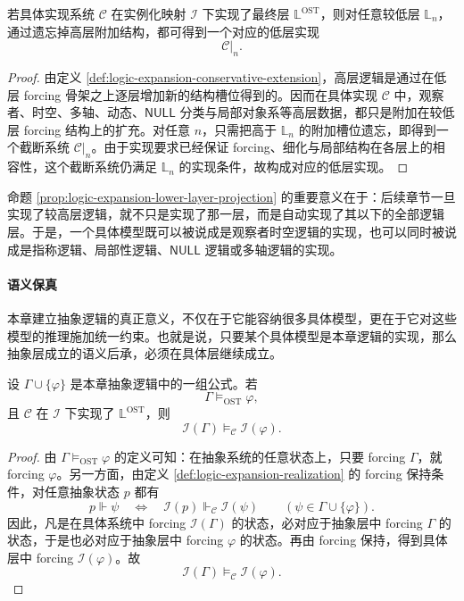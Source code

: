 \begin{proposition}[下层投影]\label{prop:logic-expansion-lower-layer-projection}
若具体实现系统 \(\mathcal C\) 在实例化映射 \(\mathcal I\) 下实现了最终层 \(\mathbb L^{\mathrm{OST}}\)，则对任意较低层 \(\mathbb L_n\)，通过遗忘掉高层附加结构，都可得到一个对应的低层实现
\[
\mathcal C|_n.
\]
\end{proposition}

\begin{proof}
由定义 \ref{def:logic-expansion-conservative-extension}，高层逻辑是通过在低层 forcing 骨架之上逐层增加新的结构槽位得到的。因而在具体实现 \(\mathcal C\) 中，观察者、时空、多轴、动态、\(\mathsf{NULL}\) 分类与局部对象系等高层数据，都只是附加在较低层 forcing 结构上的扩充。对任意 \(n\)，只需把高于 \(\mathbb L_n\) 的附加槽位遗忘，即得到一个截断系统 \(\mathcal C|_n\)。由于实现要求已经保证 forcing、细化与局部结构在各层上的相容性，这个截断系统仍满足 \(\mathbb L_n\) 的实现条件，故构成对应的低层实现。
\end{proof}

命题 \ref{prop:logic-expansion-lower-layer-projection} 的重要意义在于：后续章节一旦实现了较高层逻辑，就不只是实现了那一层，而是自动实现了其以下的全部逻辑层。于是，一个具体模型既可以被说成是观察者时空逻辑的实现，也可以同时被说成是指称逻辑、局部性逻辑、\(\mathsf{NULL}\) 逻辑或多轴逻辑的实现。

\paragraph{语义保真}
本章建立抽象逻辑的真正意义，不仅在于它能容纳很多具体模型，更在于它对这些模型的推理施加统一约束。也就是说，只要某个具体模型是本章逻辑的实现，那么抽象层成立的语义后承，必须在具体层继续成立。

\begin{proposition}[语义保真]\label{prop:logic-expansion-semantic-fidelity}
设 \(\Gamma\cup\{\varphi\}\) 是本章抽象逻辑中的一组公式。若
\[
\Gamma \models_{\mathrm{OST}} \varphi,
\]
且 \(\mathcal C\) 在 \(\mathcal I\) 下实现了 \(\mathbb L^{\mathrm{OST}}\)，则
\[
\mathcal I(\Gamma)\models_{\mathcal C}\mathcal I(\varphi).
\]
\end{proposition}

\begin{proof}
由 \(\Gamma \models_{\mathrm{OST}} \varphi\) 的定义可知：在抽象系统的任意状态上，只要 forcing \(\Gamma\)，就 forcing \(\varphi\)。另一方面，由定义 \ref{def:logic-expansion-realization} 的 forcing 保持条件，对任意抽象状态 \(p\) 都有
\[
p\Vdash \psi
\quad\Longleftrightarrow\quad
\mathcal I(p)\Vdash_{\mathcal C}\mathcal I(\psi)
\qquad(\psi\in \Gamma\cup\{\varphi\}).
\]
因此，凡是在具体系统中 forcing \(\mathcal I(\Gamma)\) 的状态，必对应于抽象层中 forcing \(\Gamma\) 的状态，于是也必对应于抽象层中 forcing \(\varphi\) 的状态。再由 forcing 保持，得到具体层中 forcing \(\mathcal I(\varphi)\)。故
\[
\mathcal I(\Gamma)\models_{\mathcal C}\mathcal I(\varphi).
\]
\end{proof}

